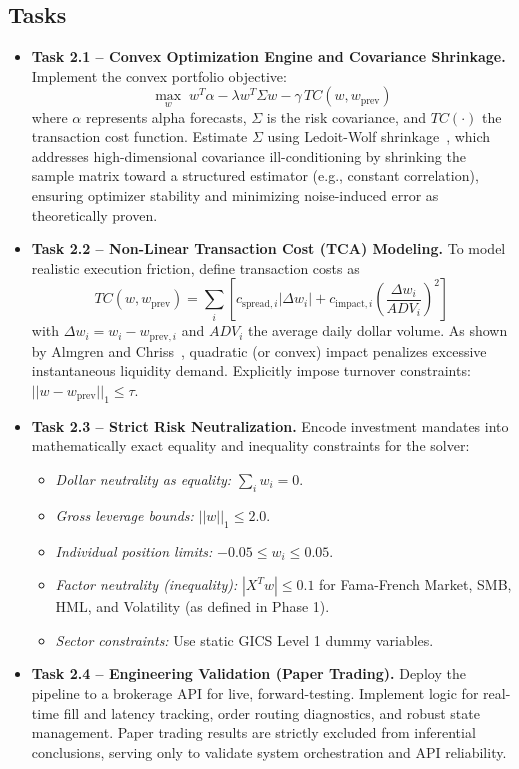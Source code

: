 \subsection*{Tasks}
\begin{itemize}
    \item \textbf{Task 2.1 -- Convex Optimization Engine and Covariance Shrinkage.} Implement the convex portfolio objective:
          \[
              \max_{w} \; w^T \alpha - \lambda w^T \Sigma w - \gamma \, TC(w, w_{\text{prev}})
          \]
          where $\alpha$ represents alpha forecasts, $\Sigma$ is the risk covariance, and $TC(\cdot)$ the transaction cost function. Estimate $\Sigma$ using Ledoit-Wolf shrinkage~\cite{LedoitWolf2004}, which addresses high-dimensional covariance ill-conditioning by shrinking the sample matrix toward a structured estimator (e.g., constant correlation), ensuring optimizer stability and minimizing noise-induced error as theoretically proven.

    \item \textbf{Task 2.2 -- Non-Linear Transaction Cost (TCA) Modeling.} To model realistic execution friction, define transaction costs as
          \[
              TC(w, w_{\text{prev}}) = \displaystyle\sum_{i} \left[ c_{\text{spread},i}|\Delta w_i| + c_{\text{impact},i} \left( \dfrac{\Delta w_i}{ADV_i} \right)^2 \right]
          \]
          with $\Delta w_i = w_i - w_{\text{prev},i}$ and $ADV_i$ the average daily dollar volume. As shown by Almgren and Chriss~\cite{AlmgrenChriss2000}, quadratic (or convex) impact penalizes excessive instantaneous liquidity demand. Explicitly impose turnover constraints: $||w - w_{\text{prev}}||_1 \le \tau$.

    \item \textbf{Task 2.3 -- Strict Risk Neutralization.} Encode investment mandates into mathematically exact equality and inequality constraints for the solver:
          \begin{itemize}
              \item \textit{Dollar neutrality as equality:} $\sum_i w_i = 0$.
              \item \textit{Gross leverage bounds:} $||w||_1 \leq 2.0$.
              \item \textit{Individual position limits:} $-0.05 \leq w_i \leq 0.05$.
              \item \textit{Factor neutrality (inequality):} $|X^T w| \leq 0.1$ for Fama-French Market, SMB, HML, and Volatility (as defined in Phase 1).
              \item \textit{Sector constraints:} Use static \acs{GICS} Level 1 dummy variables.
          \end{itemize}

    \item \textbf{Task 2.4 -- Engineering Validation (Paper Trading).} Deploy the pipeline to a brokerage \acs{API} for live, forward-testing. Implement logic for real-time fill and latency tracking, order routing diagnostics, and robust state management. Paper trading results are strictly excluded from inferential conclusions, serving only to validate system orchestration and \acs{API} reliability.
\end{itemize}

